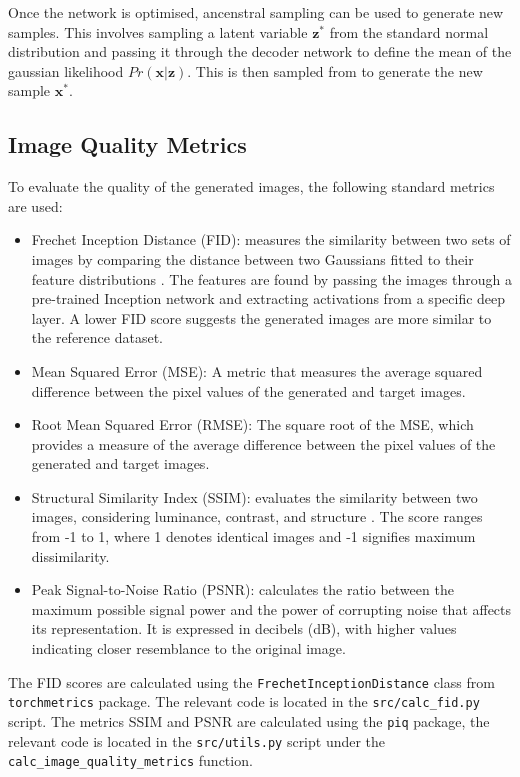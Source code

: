 \documentclass[11pt]{article}
\begin{document}
Once the network is optimised, ancenstral sampling can be used to generate new samples. This involves sampling a latent variable $\mathbf{z^*}$ from the standard normal distribution and passing it through the decoder network to define the mean of the gaussian likelihood $Pr(\mathbf{x}|\mathbf{z})$. This is then sampled from to generate the new sample $\mathbf{x^*}$.

\subsection{Image Quality Metrics}
To evaluate the quality of the generated images, the following standard metrics are used:
\begin{itemize}
    \item Frechet Inception Distance (FID): measures the similarity between two sets of images by comparing the distance between two Gaussians fitted to their feature distributions \cite{Fid}. The features are found by passing the images through a pre-trained Inception network and extracting activations from a specific deep layer. A lower FID score suggests the generated images are more similar to the reference dataset.
    \item Mean Squared Error (MSE): A metric that measures the average squared difference between the pixel values of the generated and target images.
    \item Root Mean Squared Error (RMSE): The square root of the MSE, which provides a measure of the average difference between the pixel values of the generated and target images.
    \item Structural Similarity Index (SSIM): evaluates the similarity between two images, considering luminance, contrast, and structure \cite{ssim}. The score ranges from -1 to 1, where 1 denotes identical images and -1 signifies maximum dissimilarity.
    \item Peak Signal-to-Noise Ratio (PSNR): calculates the ratio between the maximum possible signal power and the power of corrupting noise that affects its representation. It is expressed in decibels (dB), with higher values indicating closer resemblance to the original image.
\end{itemize}
The FID scores are calculated using the \texttt{FrechetInceptionDistance} class from \texttt{torchmetrics} package. The relevant code is located in the \texttt{src/calc\_fid.py} script. The metrics SSIM and PSNR are calculated using the \texttt{piq} package, the relevant code is located in the \texttt{src/utils.py} script under the \texttt{calc\_image\_quality\_metrics} function.
\end{document}
